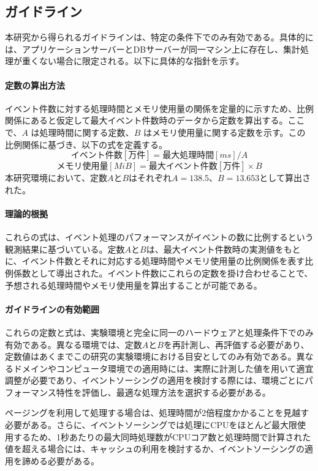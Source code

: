 \documentclass[../../main]{subfiles}
\begin{document}
    \subsection{ガイドライン}\label{subsec:consideration-guideline}

    本研究から得られるガイドラインは、特定の条件下でのみ有効である。具体的には、アプリケーションサーバーとDBサーバーが同一マシン上に存在し、集計処理が重くない場合に限定される。以下に具体的な指針を示す。

    \paragraph{定数の算出方法}
    イベント件数に対する処理時間とメモリ使用量の関係を定量的に示すため、比例関係にあると仮定して最大イベント件数時のデータから定数を算出する。ここで、\(A\) は処理時間に関する定数、\(B\) はメモリ使用量に関する定数を示す。この比例関係に基づき、以下の式を定義する。
    \[ イベント件数[万件] = 最大処理時間[ms] / A \]
    \[ メモリ使用量[MiB] = 最大イベント件数[万件] \times B \]
    本研究環境において、定数\(A\)と\(B\)はそれぞれ\(A = 138.5\)、\(B = 13.653\)として算出された。

    \paragraph{理論的根拠}
    これらの式は、イベント処理のパフォーマンスがイベントの数に比例するという観測結果に基づいている。定数\(A\)と\(B\)は、最大イベント件数時の実測値をもとに、イベント件数とそれに対応する処理時間やメモリ使用量の比例関係を表す比例係数として導出された。イベント件数にこれらの定数を掛け合わせることで、予想される処理時間やメモリ使用量を算出することが可能である。

    \paragraph{ガイドラインの有効範囲}
    これらの定数と式は、実験環境と完全に同一のハードウェアと処理条件下でのみ有効である。異なる環境では、定数\(A\)と\(B\)を再計測し、再評価する必要があり、定数値はあくまでこの研究の実験環境における目安としてのみ有効である。異なるドメインやコンピュータ環境での適用時には、実際に計測した値を用いて適宜調整が必要であり、イベントソーシングの適用を検討する際には、環境ごとにパフォーマンス特性を評価し、最適な処理方法を選択する必要がある。

    ページングを利用して処理する場合は、処理時間が2倍程度かかることを見越す必要がある。さらに、イベントソーシングでは処理にCPUをほとんど最大限使用するため、1秒あたりの最大同時処理数がCPUコア数と処理時間で計算された値を超える場合には、キャッシュの利用を検討するか、イベントソーシングの適用を諦める必要がある。

    \clearpage
\end{document}

